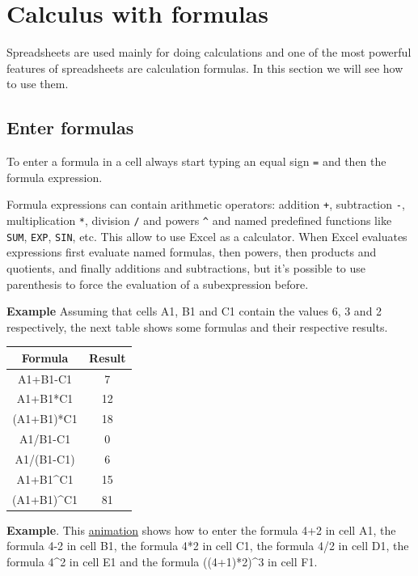 
\chapter{Calculus with formulas}

Spreadsheets are used mainly for doing calculations and one of the most powerful features of spreadsheets are calculation formulas. In this section we will see how to use them.

\section{Enter formulas}\hypertarget{enter-formulas}{}\label{enter-formulas}

To enter a formula in a cell always start typing an equal sign \texttt{=} and then the formula expression.

Formula expressions can contain arithmetic operators: addition \texttt{+}, subtraction \texttt{-}, multiplication \texttt{*}, division \texttt{/} and powers \texttt{\^{}} and named predefined functions like \texttt{SUM}, \texttt{EXP}, \texttt{SIN}, etc. This allow to use Excel as a calculator. When Excel evaluates expressions first evaluate named formulas, then powers, then products and quotients, and finally additions and subtractions, but it's possible to use parenthesis to force the evaluation of a subexpression before.

\textbf{Example} Assuming that cells A1, B1 and C1 contain the values 6, 3 and 2 respectively, the next table shows some
formulas and their respective results.

\begin{longtable}{cc}
\toprule
Formula & Result\\
\midrule
\endfirsthead
A1+B1-C1 & 7\\
A1+B1*C1 & 12\\
(A1+B1)*C1 & 18\\
A1/B1-C1 & 0\\
A1/(B1-C1) & 6\\
A1+B1\^{}C1 & 15\\
(A1+B1)\^{}C1 & 81\\
\bottomrule
\end{longtable}



\textbf{Example}. This \href{http://aprendeconalf.es/office/excel/manual/img/example_enter_formulas.gif}{animation} shows how to enter the formula 4+2 in cell A1, the formula 4-2 in cell B1, the formula 4*2 in cell C1, the formula 4/2 in cell D1, the formula 4\^{}2 in cell E1 and the formula ((4+1)*2)\^{}3 in cell F1.

